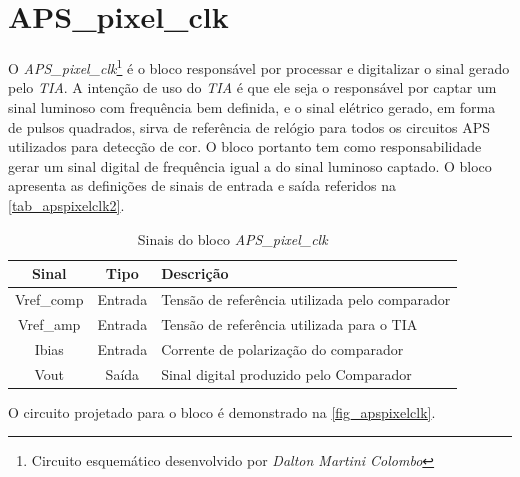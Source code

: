 \renewcommand{\NomeBloco}{\textit{APS\_pixel\_clk}}
\renewcommand{\NomeBlocoNoUnderline}{apspixelclk}
\renewcommand{\NomePTab}{tab_\NomeBlocoNoUnderline}
\renewcommand{\NomeSTab}{tab_\NomeBlocoNoUnderline2}
\renewcommand{\NomePFig}{fig_\NomeBlocoNoUnderline}
\renewcommand{\NomeSFig}{fig_\NomeBlocoNoUnderline2}
\renewcommand{\NomeTTab}{tab_\NomeBlocoNoUnderline3}
\renewcommand{\NomeQTab}{tab_\NomeBlocoNoUnderline4}

\section{APS\_pixel\_clk}

O \NomeBloco{}\footnote{Circuito esquemático desenvolvido por \textit{Dalton Martini Colombo}} \'e o bloco respons\'avel por processar e digitalizar o sinal gerado pelo \textit{TIA}. A intenção de uso do \textit{TIA} \'e que ele seja o respons\'avel por captar um sinal luminoso com frequ\^encia bem definida, e o sinal el\'etrico gerado, em forma de pulsos quadrados, sirva de refer\^encia de rel\'ogio para todos os circuitos APS utilizados para detecção de cor. O bloco portanto tem como responsabilidade gerar um sinal digital de frequ\^encia igual a do sinal luminoso captado. O bloco apresenta as definições de sinais de entrada e sa\'ida referidos na \autoref{\NomeSTab}.

\begin{table}[!h]
\caption{Sinais do bloco \NomeBloco}
\label{\NomeSTab}
\centering
\begin{tabular}{ccl}

    \toprule
    Sinal & Tipo    & Descrição\\
    \midrule \midrule
    Vref\_comp   & Entrada   & Tensão de refer\^encia utilizada pelo comparador\\
    \midrule
    Vref\_amp   & Entrada   & Tensão de refer\^encia utilizada para o TIA\\
    \midrule
    Ibias   & Entrada   & Corrente de polarização do comparador \\
    \midrule
    Vout   & Saída   & Sinal digital produzido pelo Comparador\\
    \bottomrule
\end{tabular}
\end{table}

O circuito projetado para o bloco \'e demonstrado na \autoref{\NomePFig}.

